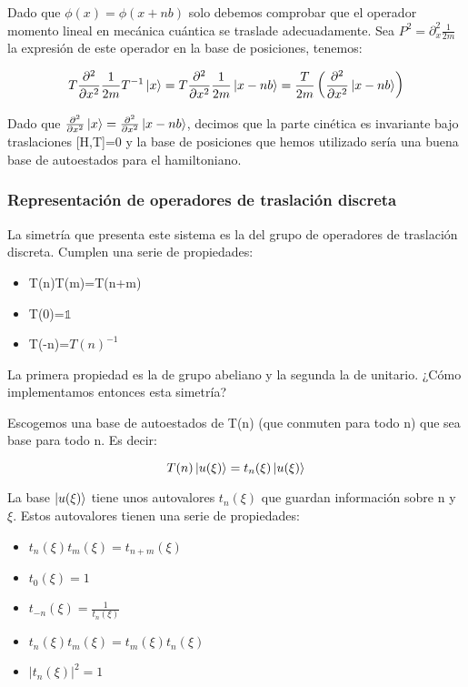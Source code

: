 \documentclass{article}
\begin{document}
Dado que $\phi (x)=\phi (x+nb)$ solo debemos comprobar que el operador momento lineal en mecánica cuántica se traslade adecuadamente. Sea $P^2=\partial ^2_x\frac{1}{2m}$ la expresión de este operador en la base de posiciones, tenemos:

$$T\frac{\partial ^2}{\partial x^2}\frac{1}{2m}T^{-1}\ket{x}=T\frac{\partial ^2}{\partial x^2}\frac{1}{2m}\ket{x-nb}=\frac{T}{2m}\left ( \frac{\partial ^2}{\partial x^2}\ket{x-nb}\right)$$

Dado que $\frac{\partial ^2}{\partial x^2}\ket{x}=\frac{\partial ^2}{\partial x^2}\ket{x-nb}$, decimos que la parte cinética es invariante bajo traslaciones [H,T]=0 y la base de posiciones que hemos utilizado sería una buena base de autoestados para el hamiltoniano.

\newpage
\subsubsection{Representación de operadores de traslación discreta}
La simetría que presenta este sistema es la del grupo de operadores de traslación discreta. Cumplen una serie de propiedades:

\begin{itemize}
    
\item T(n)T(m)=T(n+m)

\item T(0)=$\mathds{1}$

\item T(-n)=$T(n)^{-1}$

\end{itemize}

La primera propiedad es la de grupo abeliano y la segunda la de unitario. ¿Cómo implementamos entonces esta simetría?

Escogemos una base de autoestados de T(n) (que conmuten para todo n) que sea base para todo n. Es decir:

$$T(n) \ket{u(\xi)}=t_n(\xi)\ket{u(\xi)}$$

La base $\ket{u(\xi)}$ tiene unos autovalores $t_n(\xi)$ que guardan información sobre n y $\xi$. Estos autovalores tienen una serie de propiedades:

\begin{itemize}
    \item $t_n (\xi) t_m(\xi) = t_{n+m}(\xi)$
    \item $t_0(\xi)=1$
    \item $t_{-n}(\xi)=\frac{1}{t_n(\xi)}$
    \item $t_n(\xi)t_m(\xi)=t_m(\xi)t_n(\xi)$
    \item $|t_n(\xi)|^2=1$
\end{itemize}
\end{document}
